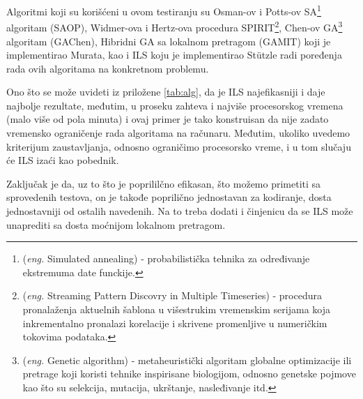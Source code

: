 \documentclass[a4paper]{article}
\newcommand{\eng}[1]{(\textit{eng.} #1)}
\begin{document}
Algoritmi koji su korišćeni u ovom testiranju su Osman-ov i Potts-ov SA\footnote{ \eng{Simulated annealing} - probabilistička tehnika za određivanje ekstremuma date funckije.} algoritam (SAOP), Widmer-ova i Hertz-ova procedura SPIRIT\footnote{ \eng{Streaming Pattern Discovry in Multiple Timeseries} - procedura pronalaženja aktuelnih šablona u višestrukim vremenskim serijama koja inkrementalno pronalazi korelacije i skrivene promenljive u numeričkim tokovima podataka.}, Chen-ov GA\footnote{ \eng{Genetic algorithm} - metaheuristički algoritam globalne optimizacije ili pretrage koji koristi tehnike inspirisane biologijom, odnosno genetske pojmove kao što su selekcija, mutacija, ukrštanje, nasleđivanje itd.} algoritam (GAChen), Hibridni GA sa lokalnom pretragom (GAMIT) koji je implementirao Murata, kao i ILS koju je implementirao Stützle radi poređenja rada ovih algoritama na konkretnom problemu.


Ono što se može uvideti iz priložene \autoref{tab:alg}, da je ILS najefikasniji i daje najbolje rezultate, međutim, u proseku zahteva i najviše procesorskog vremena (malo više od pola minuta) i ovaj primer je tako konstruisan da nije zadato vremensko ograničenje rada algoritama na računaru. Međutim, ukoliko uvedemo kriterijum zaustavljanja, odnosno ograničimo procesorsko vreme, i u tom slučaju će ILS izaći kao pobednik.

Zaključak je da, uz to što je poprililčno efikasan, što možemo primetiti sa sprovedenih testova, on je takođe poprilično jednostavan za kodiranje, dosta jednostavniji od ostalih navedenih. Na to treba dodati i činjenicu da se ILS može unaprediti sa dosta moćnijom lokalnom pretragom.






\end{document}
